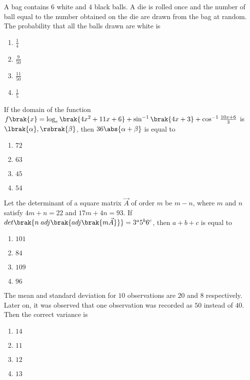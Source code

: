     \item A bag contains $6$ white and $4$ black balls. A die is rolled once and the number of ball equal to the number obtained on the die are drawn from the bag at random. The probability that all the balls drawn are white is
    \hfill{}

	\begin{enumerate}
		\item $\frac{1}{4}$
		\item $\frac{9}{50}$
		\item $\frac{11}{50}$
		\item $\frac{1}{5}$
	\end{enumerate}

    \item If the domain of the function $f\brak{x} = \log_{e}\brak{4x^2 + 11x + 6} + \sin^{-1}\brak{4x + 3} + \cos^{-1}\frac{10x + 6}{3}$ is $\lbrak{\alpha}, \rsbrak{\beta}$, then $36\abs{\alpha + \beta}$ is equal to 
    \hfill{}

	\begin{enumerate}
		\item $72$ 
		\item $63$
		\item $45$
		\item $54$
	\end{enumerate}

    \item Let the determinant of a square matrix $\vec{A}$ of order $m$ be $m - n$, where $m$ and $n$ satisfy $4m + n = 22$ and $17m + 4n = 93$. If $det\brak{n\; adj\brak{adj\brak{m\vec{A}}}} = 3^{a}5^{b}6^{c}$, then $a + b + c$ is equal to
    \hfill{}

	\begin{enumerate}
		\item $101$ 
		\item $84$
		\item $109$
		\item $96$
	\end{enumerate}


    \item The mean and standard deviation for $10$ observations are $20$ and $8$ respectively. Later on, it was observed that one observation was recorded as $50$ instead of $40$. Then the correct variance is
    \hfill{}

	\begin{enumerate}
		\item $14$ 
		\item $11$
		\item $12$
		\item $13$
	\end{enumerate}

